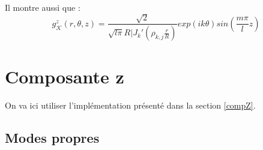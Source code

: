Il montre aussi que :
\[
g_\mathcal{K}^z(r,\theta,z) = \frac{\sqrt{2}}{\sqrt{l\pi}R|J_k'\left(\rho_{k,j}\frac{r}{R}\right)}exp(ik\theta)sin\left(\frac{m\pi}{l}z\right)
\]

\iffalse

Pour mémoire, voici les résultats de différents modes obtenus avec freefem++.\\

\begin{figure}[H]
\makebox[\textwidth][c]{
\texttt{[image: Exemple\_de\_modes]}}
\end{figure}

On peut voir les mêmes modes obtenus avec Feel++ dans la figure \ref{modes}.\\

\begin{figure}[H]
	\makebox[\textwidth][c]{
		\subfloat[mode00]{\texttt{[image: mode00]}}\ 
		\subfloat[mode19]{\texttt{[image: mode19]}}
	}\\
	\makebox[\textwidth][c]{
		\subfloat[mode57]{\texttt{[image: mode57]}}\ 
		\subfloat[mode194]{\texttt{[image: mode194]}}
	}
	\caption{composante z des fonctions propres}
	\label{modes}
\end{figure}

\fi

\section{Composante z}

On va ici utiliser l'implémentation présenté dans la section \ref{compZ}.

\subsection{Modes propres}

